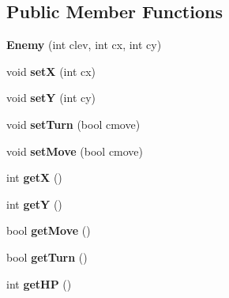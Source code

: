 \subsection*{Public Member Functions}
\begin{DoxyCompactItemize}
\item 
\hypertarget{class_enemy_a0638b6e9f11a72831051438dbf803d91}{{\bfseries Enemy} (int clev, int cx, int cy)}\label{class_enemy_a0638b6e9f11a72831051438dbf803d91}

\item 
\hypertarget{class_enemy_a0ebc35bd4cd41e81df912b6286426c46}{void {\bfseries set\-X} (int cx)}\label{class_enemy_a0ebc35bd4cd41e81df912b6286426c46}

\item 
\hypertarget{class_enemy_a1fab961fbc5b1fd1764515c1a00f424b}{void {\bfseries set\-Y} (int cy)}\label{class_enemy_a1fab961fbc5b1fd1764515c1a00f424b}

\item 
\hypertarget{class_enemy_aa07b45a0163d1c16326dc8706ec77414}{void {\bfseries set\-Turn} (bool cmove)}\label{class_enemy_aa07b45a0163d1c16326dc8706ec77414}

\item 
\hypertarget{class_enemy_a8742266192bffefd0746d5665e816463}{void {\bfseries set\-Move} (bool cmove)}\label{class_enemy_a8742266192bffefd0746d5665e816463}

\item 
\hypertarget{class_enemy_abdd71d2a54bf169ffb71801091704881}{int {\bfseries get\-X} ()}\label{class_enemy_abdd71d2a54bf169ffb71801091704881}

\item 
\hypertarget{class_enemy_a056667d7235d861cdc88ecfe2341ca90}{int {\bfseries get\-Y} ()}\label{class_enemy_a056667d7235d861cdc88ecfe2341ca90}

\item 
\hypertarget{class_enemy_a742cf2ff493fd15a4a11a13e20e60423}{bool {\bfseries get\-Move} ()}\label{class_enemy_a742cf2ff493fd15a4a11a13e20e60423}

\item 
\hypertarget{class_enemy_ad25491cf4bd75217a4d97318f0ec0677}{bool {\bfseries get\-Turn} ()}\label{class_enemy_ad25491cf4bd75217a4d97318f0ec0677}

\item 
\hypertarget{class_enemy_ab1c5ecbd2567b509a5d4492764a28f5d}{int {\bfseries get\-H\-P} ()}\label{class_enemy_ab1c5ecbd2567b509a5d4492764a28f5d}


\end{DoxyCompactItemize}
